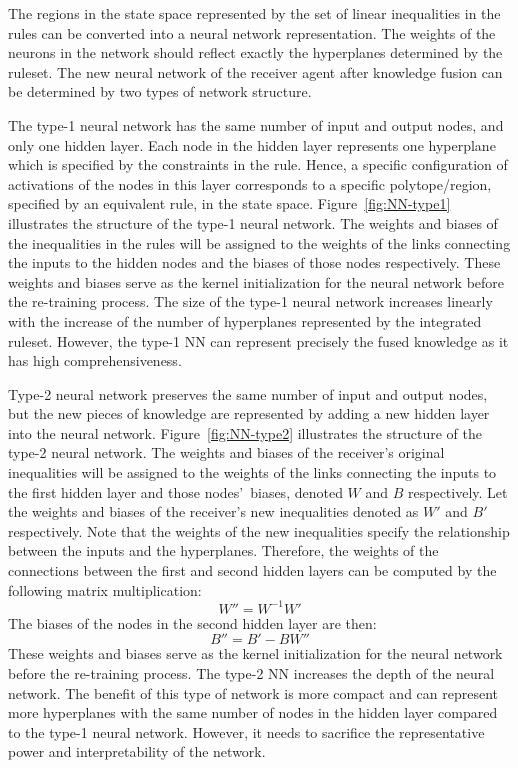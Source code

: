\documentclass[lettersize,journal]{IEEEtran}
\begin{document}
The regions in the state space represented by the set of linear inequalities in the rules can be converted into a neural network representation. The weights of the neurons in the network should reflect exactly the hyperplanes determined by the ruleset. The new neural network of the receiver agent after knowledge fusion can be determined by two types of network structure.

The type-1 neural network has the same number of input and output nodes, and only one hidden layer. Each node in the hidden layer represents one hyperplane which is specified by the constraints in the rule. Hence, a specific configuration of activations of the nodes in this layer corresponds to a specific polytope/region, specified by an equivalent rule, in the state space. Figure~\ref{fig:NN-type1} illustrates the structure of the type-1 neural network. The weights and biases of the inequalities in the rules will be assigned to the weights of the links connecting the inputs to the hidden nodes and the biases of those nodes respectively. These weights and biases serve as the kernel initialization for the neural network before the re-training process.
The size of the type-1 neural network increases linearly with the increase of the number of hyperplanes represented by the integrated ruleset. However, the type-1 NN can represent precisely the fused knowledge as it has high comprehensiveness.

Type-2 neural network preserves the same number of input and output nodes, but the new pieces of knowledge are represented by adding a new hidden layer into the neural network. Figure~\ref{fig:NN-type2} illustrates the structure of the type-2 neural network. The weights and biases of the receiver\textquoteright s original inequalities will be assigned to the weights of the links connecting the inputs to the first hidden layer and those nodes\textquoteright \ biases, denoted $W$ and $B$ respectively. Let the weights and biases of the receiver\textquoteright s new inequalities denoted as $W'$ and $B'$ respectively. Note that the weights of the new inequalities specify the relationship between the inputs and the hyperplanes. Therefore, the weights of the connections between the first and second hidden layers can be computed by the following matrix multiplication:
\begin{equation}
    W'' = W^{-1}W'
\end{equation}
The biases of the nodes in the second hidden layer are then:
\begin{equation}
    B'' = B'-BW''
\end{equation}
These weights and biases serve as the kernel initialization for the neural network before the re-training process. The type-2 NN increases the depth of the neural network. The benefit of this type of network is more compact and can represent more hyperplanes with the same number of nodes in the hidden layer compared to the type-1 neural network. However, it needs to sacrifice the representative power and interpretability of the network.
\end{document}
